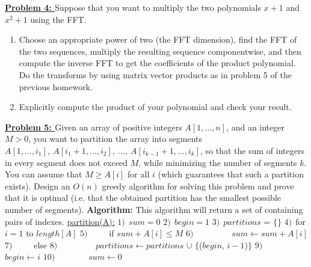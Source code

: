 \documentclass[11pt]{article}
\begin{document}
\begin{flushleft}
	\newpage
	\textbf{\underline{Problem 4: }}Suppose that you want to multiply the two polynomials $x + 1$ and $x^2 + 1$
	using the FFT. 
	\begin{enumerate}
		\item 
		Choose an appropriate power of two (the FFT dimension), find the FFT of the
		two sequences, multiply the resulting sequence
		componentwise, and then compute the
		inverse FFT to get the coefficients of the product polynomial.
		Do the transforms by using matrix vector products
		as in problem 5 of the previous homework.
		\item
		Explicitly compute the product of your polynomial and check
		your result.
	\end{enumerate}
	\newpage
	\textbf{\underline{Problem 5: }}Given an array of positive integers $A[1,\dots,n]$, and an integer
	$M>0$, you want to partition the array into segments $A[1,\dots,i_1],\
	A[i_1+1,\dots,i_2],\ \dots,\ A[i_{k-1}+1,\dots,i_k]$, so that the sum of
	integers in every segment does not exceed $M$, while minimizing the
	number of segments $k$. You can assume that $M\geq A[i]$ for all $i$
	(which guarantees that such a partition exists). Design an $O(n)$ greedy
	algorithm for solving this problem and prove that it is optimal
	(i.e. that the obtained partition has the smallest possible number of segments).
	\newline
	\newline
	\textbf{Algorithm: } This algorithm will return a set of containing pairs of indexes.
	\newline
	\newline
	\underline{partition(A):}
	\newline
	$1)\ \ sum = 0$ 	\newline
	$2)\ \ begin = 1$	\newline
	$3)\ \ partitions$ = $\lbrace \rbrace$
	\newline
	$4)\ \ $for $i = 1$ to $length[A]$ \newline
	$5)\ \qquad$ if $sum + A[i] \leq M$   \newline
	$6)\ \qquad\qquad$ $sum \leftarrow sum + A[i]$ \newline
	$7)\ \qquad$ else \newline
	$8)\ \qquad\qquad$ $partitions \leftarrow partitions$ $\cup$ $\lbrace$($begin$, $i - 1$)$\rbrace$ \newline
	$9)\ \qquad\qquad$ $begin \leftarrow i$ \newline
	$10) \qquad\qquad$$sum \leftarrow 0$ \newline
$$
\end{flushleft}
\end{document}

